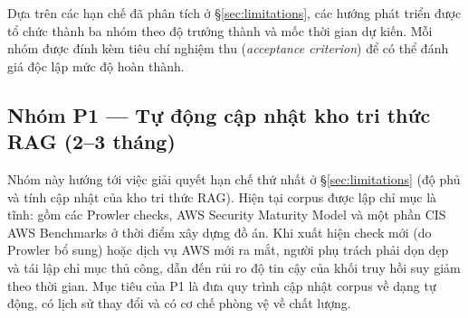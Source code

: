 Dựa trên các hạn chế đã phân tích ở §\ref{sec:limitations}, các hướng phát triển được tổ chức thành ba nhóm theo độ trưởng thành và mốc thời gian dự kiến. Mỗi nhóm được đính kèm tiêu chí nghiệm thu (\textit{acceptance criterion}) để có thể đánh giá độc lập mức độ hoàn thành.

\subsection{Nhóm P1 --- Tự động cập nhật kho tri thức RAG (2--3 tháng)}
\label{subsec:fw-p1}

Nhóm này hướng tới việc giải quyết hạn chế thứ nhất ở §\ref{sec:limitations} (độ phủ và tính cập nhật của kho tri thức RAG). Hiện tại corpus được lập chỉ mục là tĩnh: gồm các Prowler checks, AWS Security Maturity Model và một phần CIS AWS Benchmarks ở thời điểm xây dựng đồ án. Khi xuất hiện check mới (do Prowler bổ sung) hoặc dịch vụ AWS mới ra mắt, người phụ trách phải dọn dẹp và tái lập chỉ mục thủ công, dẫn đến rủi ro độ tin cậy của khối truy hồi suy giảm theo thời gian. Mục tiêu của P1 là đưa quy trình cập nhật corpus về dạng tự động, có lịch sử thay đổi và có cơ chế phòng vệ về chất lượng.

